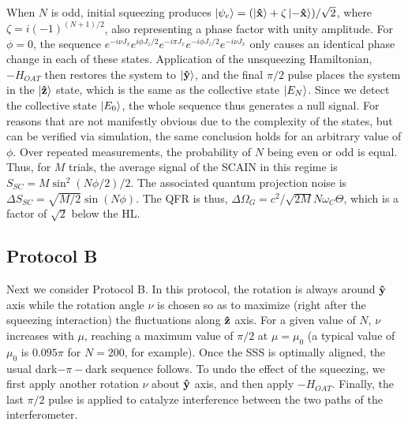 \documentclass[aps,pra,letterpaper,superscriptaddress,showpacs,amsmath,floats,twocolumn]{revtex4-1}
\begin{document}
When $N$ is odd, initial squeezing produces $\ket{\psi_e}=(\ket{\vu{x}} +\zeta \ket{-\vu{x}})/\sqrt{2}$, where $\zeta=i(-1)^{(N+1)/2}$, also representing a phase factor with unity amplitude. For $\phi = 0$, the sequence $e^{-i\nu J_x}e^{i\phi J_z/2}e^{-i\pi J_x}e^{-i\phi J_z/2}e^{-i\nu J_x}$ only causes an identical phase change in each of these states. Application of the unsqueezing Hamiltonian, $-H_{OAT}$ then restores the system to $\ket{\vu{y}}$, and the final $\pi/2$ pulse places the system in the $\ket{\vu{z}}$ state, which is the same as the collective state $\ket{E_N}$. Since we detect the collective state $\ket{E_0}$, the whole sequence thus generates a null signal. For reasons that are not manifestly obvious due to the complexity of the states, but can be verified via simulation, the same conclusion holds for an arbitrary value of $\phi$. Over repeated measurements, the probability of $N$ being even or odd is equal. Thus, for $M$ trials, the average signal of the SCAIN in this regime is $S_{SC} = M\sin^2(N\phi/2)/2$. The associated quantum projection noise is $\Delta S_{SC} = \sqrt{M/2}\sin(N\phi)$. The QFR is thus, $\Delta\Omega_G = c^2/\sqrt{2M}N\omega_C\Theta$, which is a factor of $\sqrt{2}$ below the HL.

\subsection{Protocol B}
Next we consider Protocol B. In this protocol, the rotation is always around $\vu{y}$ axis while the rotation angle $\nu$ is chosen so as to maximize (right after the squeezing interaction) the fluctuations along $\vu{z}$ axis. For a given value of $N$, $\nu$ increases with $\mu$, reaching a maximum value of $\pi/2$ at $\mu=\mu_0$ (a typical value of $\mu_0$ is $0.095\pi$ for $N=200$, for example). Once the SSS is optimally aligned, the usual dark$-\pi-$dark sequence follows. To undo the effect of the squeezing, we first apply another rotation $\nu$ about $\vu{y}$ axis, and then apply $-H_{OAT}$. Finally, the last $\pi/2$ pulse is applied to catalyze interference between the two paths of the interferometer. 
\end{document}
